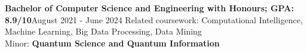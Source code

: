     {\textbf{Bachelor of Computer Science and Engineering with Honours;  GPA: 8.9/10}}{August 2021 - June 2024}
    \small{Related coursework: Computational Intelligence, Machine Learning, Big Data Processing, Data Mining}\\
    
    \small{Minor: \textbf{Quantum Science and Quantum Information}}\\
